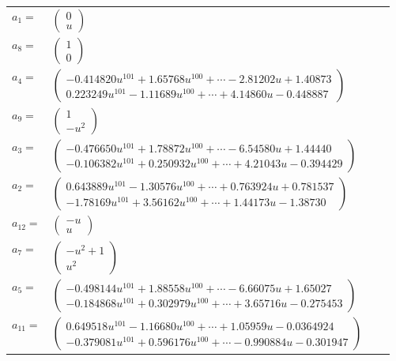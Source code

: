 \documentclass[1p]{elsarticle_modified}
\theoremstyle{definition}
\begin{document}
\begin{tabular}{m{7pt} m{180pt} m{7pt} m{180pt} }
\flushright $a_{1}=$&$\begin{pmatrix}0\\u\end{pmatrix}$ \\
\flushright $a_{8}=$&$\begin{pmatrix}1\\0\end{pmatrix}$ \\
\flushright $a_{4}=$&$\begin{pmatrix}-0.414820 u^{101}+1.65768 u^{100}+\cdots-2.81202 u+1.40873\\0.223249 u^{101}-1.11689 u^{100}+\cdots+4.14860 u-0.448887\end{pmatrix}$ \\
\flushright $a_{9}=$&$\begin{pmatrix}1\\- u^2\end{pmatrix}$ \\
\flushright $a_{3}=$&$\begin{pmatrix}-0.476650 u^{101}+1.78872 u^{100}+\cdots-6.54580 u+1.44440\\-0.106382 u^{101}+0.250932 u^{100}+\cdots+4.21043 u-0.394429\end{pmatrix}$ \\
\flushright $a_{2}=$&$\begin{pmatrix}0.643889 u^{101}-1.30576 u^{100}+\cdots+0.763924 u+0.781537\\-1.78169 u^{101}+3.56162 u^{100}+\cdots+1.44173 u-1.38730\end{pmatrix}$ \\
\flushright $a_{12}=$&$\begin{pmatrix}- u\\u\end{pmatrix}$ \\
\flushright $a_{7}=$&$\begin{pmatrix}- u^2+1\\u^2\end{pmatrix}$ \\
\flushright $a_{5}=$&$\begin{pmatrix}-0.498144 u^{101}+1.88558 u^{100}+\cdots-6.66075 u+1.65027\\-0.184868 u^{101}+0.302979 u^{100}+\cdots+3.65716 u-0.275453\end{pmatrix}$ \\
\flushright $a_{11}=$&$\begin{pmatrix}0.649518 u^{101}-1.16680 u^{100}+\cdots+1.05959 u-0.0364924\\-0.379081 u^{101}+0.596176 u^{100}+\cdots-0.990884 u-0.301947\end{pmatrix}$ \\

\end{tabular}
\end{document}
